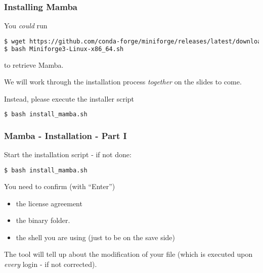 {   
}
\begin{frame}[fragile]
  \frametitle{Installing Mamba}
  You \emph{could} run
  \begin{lstlisting}[language=Bash, style=Shell, basicstyle=\tiny,breaklines=true ]
$ wget https://github.com/conda-forge/miniforge/releases/latest/download/Miniforge3-Linux-x86_64.sh
$ bash Miniforge3-Linux-x86_64.sh
  \end{lstlisting}
  to retrieve Mamba.\newline\pause
  \begin{hint}
  	We will work through the installation process \emph{together} on the slides to come.
  \end{hint}
  Instead, please execute the installer script
  \begin{lstlisting}[language=Bash, style=Shell]
$ bash install_mamba.sh
  \end{lstlisting}
\end{frame} 

\begin{frame}[fragile]
  \frametitle{Mamba - Installation - Part I}
  Start the installation script - if not done:
  \begin{lstlisting}[language=Bash, style=Shell]
$ bash install_mamba.sh
  \end{lstlisting}
  You need to confirm (with ``Enter'')
  \begin{itemize}[<+->]
  	\item the license agreement
	\item the binary folder.
	\item the shell you are using (just to be on the save side)
  \end{itemize} 
  The tool will tell up about the modification of your  file (which is executed upon \emph{every} login - if not corrected).
\end{frame}
	

